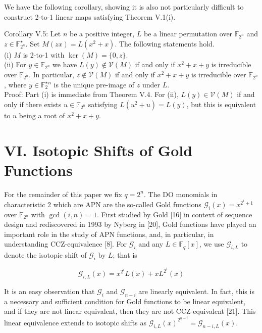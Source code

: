 \documentclass[10pt]{article}
\begin{document}
We have the following corollary, showing it is also not particularly difficult to construct 2-to-1 linear maps satisfying Theorem V.1(i).

Corollary V.5: Let $n$ be a positive integer, $L$ be a linear permutation over $\mathbb{F}_{2^{n}}$ and $z \in \mathbb{F}_{2^{n}}^{\star}$. Set $M(z x)=L\left(x^{2}+x\right)$. The following statements hold.\\
(i) $M$ is 2-to-1 with $\operatorname{ker}(M)=\{0, z\}$.\\
(ii) For $y \in \mathbb{F}_{2^{n}}$ we have $L(y) \notin \mathcal{V}(M)$ if and only if $x^{2}+x+y$ is irreducible over $\mathbb{F}_{2^{n}}$. In particular, $z \notin \mathcal{V}(M)$ if and only if $x^{2}+x+y$ is irreducible over $\mathbb{F}_{2^{n}}$, where $y \in \mathbb{F}_{2}^{\star}{ }^{n}$ is the unique pre-image of $z$ under $L$.\\
Proof: Part (i) is immediate from Theorem V.4. For (ii), $L(y) \in \mathcal{V}(M)$ if and only if there exists $u \in \mathbb{F}_{2^{n}}$ satisfying $L\left(u^{2}+u\right)=L(y)$, but this is equivalent to $u$ being a root of $x^{2}+x+y$.

\section*{VI. Isotopic Shifts of Gold Functions}
For the remainder of this paper we fix $q=2^{n}$. The DO monomials in characteristic 2 which are APN are the so-called Gold functions $\mathcal{G}_{i}(x)=x^{2^{i}+1}$ over $\mathbb{F}_{2^{n}}$ with $\operatorname{gcd}(i, n)=1$. First studied by Gold [16] in context of sequence design and rediscovered in 1993 by Nyberg in [20], Gold functions have played an important role in the study of APN functions, and, in particular, in understanding CCZ-equivalence [8]. For $\mathcal{G}_{i}$ and any $L \in \mathbb{F}_{q}[x]$, we use $\mathcal{G}_{i, L}$ to denote the isotopic shift of $\mathcal{G}_{i}$ by $L$; that is


\begin{equation*}
\mathcal{G}_{i, L}(x)=x^{2^{i}} L(x)+x L^{2^{i}}(x) \tag{6}
\end{equation*}


It is an easy observation that $\mathcal{G}_{i}$ and $\mathcal{G}_{n-i}$ are linearly equivalent. In fact, this is a necessary and sufficient condition for Gold functions to be linear equivalent, and if they are not linear equivalent, then they are not CCZ-equivalent [21]. This linear equivalence extends to isotopic shifts as $\mathcal{G}_{i, L}(x)^{2^{n-i}}= \mathcal{G}_{n-i, L}(x)$.
\end{document}

